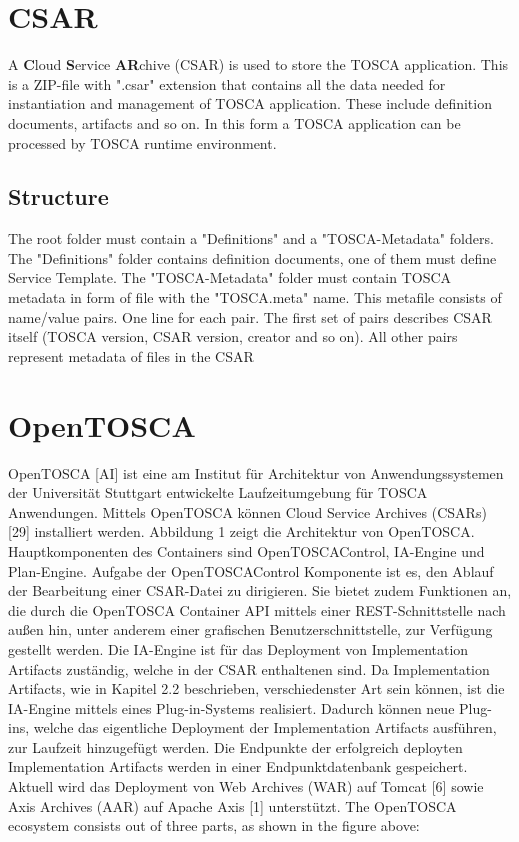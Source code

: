 \section{CSAR} \label{sec:csar}
A \textbf{C}loud \textbf{S}ervice \textbf{AR}chive (CSAR) is used to store the TOSCA application.
This is a ZIP-file with ".csar" extension that contains all the data needed for instantiation and management of TOSCA application.
These include definition documents, artifacts and so on.
In this form a TOSCA application can be processed by TOSCA runtime environment.
\subsection*{Structure}
The root folder must contain a "Definitions" and a "TOSCA-Metadata" folders.
The "Definitions" folder contains definition documents, one of them must define Service Template.
The "TOSCA-Metadata" folder must contain TOSCA metadata in form of file with the "TOSCA.meta" name.
This metafile consists of name/value pairs. 
One line for each pair. 
The first set of pairs describes CSAR itself (TOSCA version, CSAR version, creator and so on). 
All other pairs represent metadata of files in the CSAR

\section{OpenTOSCA} \label{sec:opentosca}
OpenTOSCA [AI] ist eine am Institut für Architektur von Anwendungssystemen der Universität
Stuttgart entwickelte Laufzeitumgebung für TOSCA Anwendungen.
Mittels OpenTOSCA können Cloud Service Archives (CSARs) [29] installiert
werden.
Abbildung 1 zeigt die Architektur von OpenTOSCA. Hauptkomponenten des
Containers sind OpenTOSCAControl, IA-Engine und Plan-Engine.
Aufgabe der OpenTOSCAControl Komponente ist es, den Ablauf der Bearbeitung
einer CSAR-Datei zu dirigieren. Sie bietet zudem Funktionen an, die durch
die OpenTOSCA Container API mittels einer REST-Schnittstelle nach außen hin,
unter anderem einer grafischen Benutzerschnittstelle, zur Verfügung gestellt
werden.
Die IA-Engine ist für das Deployment von Implementation Artifacts
zuständig, welche in der CSAR enthaltenen sind. Da Implementation
Artifacts, wie in Kapitel 2.2 beschrieben, verschiedenster Art sein können,
ist die IA-Engine mittels eines Plug-in-Systems realisiert. Dadurch können neue
Plug-ins, welche das eigentliche Deployment der Implementation
Artifacts ausführen, zur Laufzeit hinzugefügt werden. Die Endpunkte der
erfolgreich deployten Implementation Artifacts werden in einer Endpunktdatenbank
gespeichert. Aktuell wird das Deployment von Web Archives
(WAR) auf Tomcat [6] sowie Axis Archives (AAR) auf Apache Axis [1] unterstützt.
The OpenTOSCA ecosystem consists out of three parts, as shown in the figure above:

